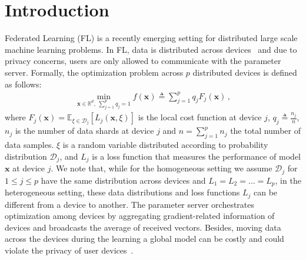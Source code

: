 \documentclass[twoside]{article}
\begin{document}
\vspace{-0.2in}
\section{Introduction}
\vspace{-0.05in}
Federated Learning (FL) is a recently emerging setting for distributed large scale machine learning problems.
In FL, data is distributed across devices~\cite{mcmahan2016communication,konevcny2016federated} and due to privacy concerns, users are only allowed to communicate with the parameter server.
Formally, the optimization problem across $p$ distributed devices is defined as follows:
\begin{align}\label{eq:main}
   \min_{\boldsymbol{x}\in \mathbb{R}^{d},\: \sum_{j=1}^pq_j=1} f(\boldsymbol{x})\triangleq \sum_{j=1}^{p}q_jF_j(\boldsymbol{x}) \, , 
\end{align}
where $F_j(\boldsymbol{x})=\mathbb{E}_{\xi\in\mathcal{D}_j}\left[L_j\left(\boldsymbol{x},\xi\right)\right]$ is the local cost function at device $j$, $q_j\triangleq\frac{n_j}{n}$, $n_j$ is the number of data shards at device $j$ and $n=\sum_{j=1}^pn_j$ the total number of data samples.
$\xi$ is a random variable distributed according to probability distribution $\mathcal{D}_j$, and $L_j$ is a loss function that measures the performance of model $\boldsymbol{x}$ at device $j$. 
We note that, while for the homogeneous setting we assume $\mathcal{D}_j$ for $1\leq j\leq p$ have the same distribution across devices and $L_1=L_2=\ldots=L_p$, in the heterogeneous setting, these data distributions and loss functions $L_j$ can be different from a device to another. 
The parameter server orchestrates optimization among devices by aggregating gradient-related information of devices and broadcasts the average of received vectors. 
Besides, moving data across the devices during the learning a global model can be costly and could violate the privacy of user devices~\cite{carlini2019secret,mcmahan2017learning}. 
\end{document}
